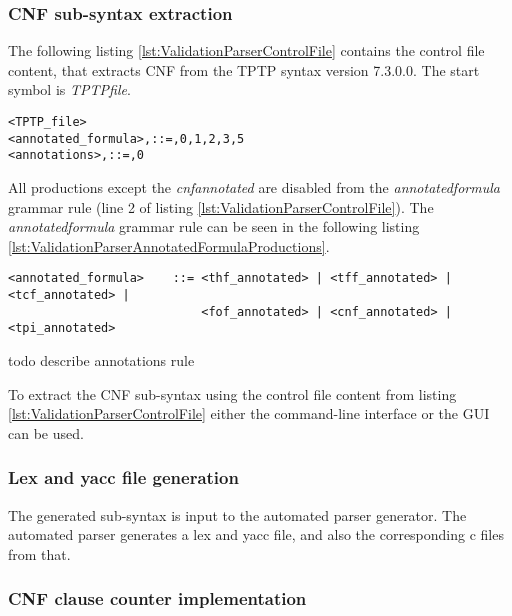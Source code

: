 \subsubsection{\ac{CNF} sub-syntax extraction}\label{sec:ValidationAutomatedParserGenerationBuildingBasicParserSubSyntax}

The following listing \ref{lst:ValidationParserControlFile} contains the control file content, that extracts \ac{CNF} from the TPTP syntax version 7.3.0.0.
The start symbol is \textit{TPTP\textunderscore file}.
\begin{lstlisting}[language = None, caption= Control file to extract \ac{CNF}, label= lst:ValidationParserControlFile]
<TPTP_file>
<annotated_formula>,::=,0,1,2,3,5
<annotations>,::=,0
\end{lstlisting}

All productions except the \textit{cnf\textunderscore annotated} are disabled from the \textit{annotated\textunderscore formula} grammar rule (line 2 of listing \ref{lst:ValidationParserControlFile}).
The \textit{annotated\textunderscore formula} grammar rule can be seen in the following listing \ref{lst:ValidationParserAnnotatedFormulaProductions}.
\begin{lstlisting}[language = None,caption= \textit{annotated\textunderscore formula} production rule, label= lst:ValidationParserAnnotatedFormulaProductions]
<annotated_formula>    ::= <thf_annotated> | <tff_annotated> | <tcf_annotated> |
                           <fof_annotated> | <cnf_annotated> | <tpi_annotated>
\end{lstlisting}

todo describe annotations rule

To extract the \ac{CNF} sub-syntax using the control file content from listing \ref{lst:ValidationParserControlFile} either the command-line interface or the GUI can be used.

\subsubsection{Lex and yacc file generation}\label{sec:ValidationAutomatedParserGenerationBuildingBasicParserGenerateFiles}

The generated sub-syntax is input to the automated parser generator.
The automated parser generates  a lex and yacc file, and also the corresponding c files from that.

\subsubsection{\ac{CNF} clause counter implementation}\label{sec:ValidationAutomatedParserGenerationBuildingBasicParserClauseCounter}

